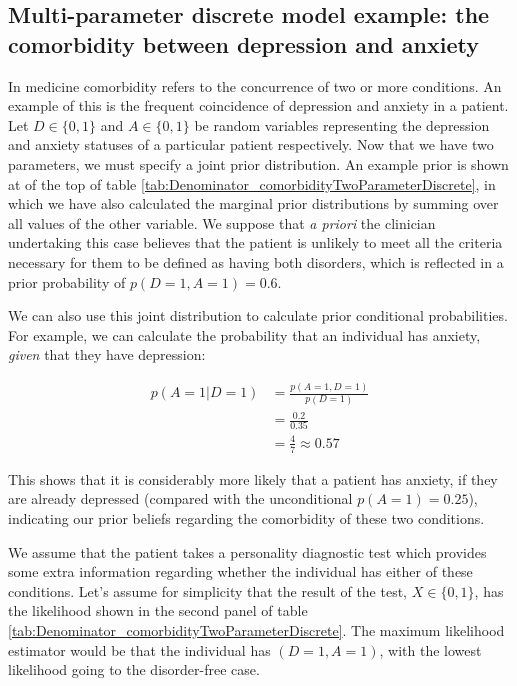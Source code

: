 \documentclass[11pt,fullpage]{book}
\begin{document}
\subsection{Multi-parameter discrete model example: the comorbidity between depression and anxiety}\label{sec:Denominator_comorbidityTwoParameterDiscrete}
In medicine comorbidity refers to the concurrence of two or more conditions. An example of this is the frequent coincidence of depression and anxiety in a patient. Let $D\in\{0,1\}$ and $A\in\{0,1\}$ be random variables representing the depression and anxiety statuses of a particular patient respectively. Now that we have two parameters, we must specify a joint prior distribution. An example prior is shown at of the top of table \ref{tab:Denominator_comorbidityTwoParameterDiscrete}, in which we have also calculated the marginal prior distributions by summing over all values of the other variable. We suppose that \textit{a priori} the clinician undertaking this case believes that the patient is unlikely to meet all the criteria necessary for them to be defined as having both disorders, which is reflected in a prior probability of $p(D=1,A=1)=0.6$.

We can also use this joint distribution to calculate prior conditional probabilities. For example, we can calculate the probability that an individual has anxiety, \textit{given} that they have depression:

\begin{equation}
\begin{align}
p(A=1|D=1) &= \frac{p(A=1,D=1)}{p(D=1)}\\
&= \frac{0.2}{0.35}\\
&=\frac{4}{7}\approx 0.57
\end{align}
\end{equation}

This shows that it is considerably more likely that a patient has anxiety, if they are already depressed (compared with the unconditional $p(A=1)=0.25$), indicating our prior beliefs regarding the comorbidity of these two conditions.

We assume that the patient takes a personality diagnostic test which provides some extra information regarding whether the individual has either of these conditions. Let's assume for simplicity that the result of the test, $X\in\{0,1\}$, has the likelihood shown in the second panel of table \ref{tab:Denominator_comorbidityTwoParameterDiscrete}. The maximum likelihood estimator would be that the individual has $(D=1,A=1)$, with the lowest likelihood going to the disorder-free case.
\end{document}
